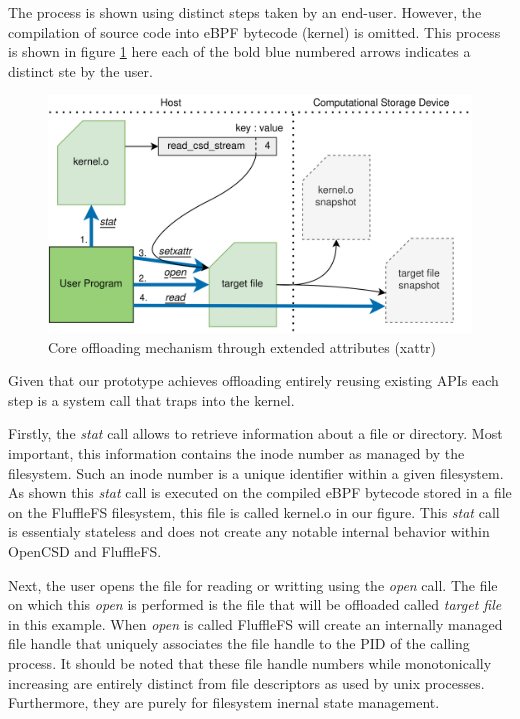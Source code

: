 The process is shown using distinct steps taken by an end-user. However, the
compilation of source code into eBPF bytecode (kernel) is omitted. This process
is shown in figure \ref{figure:offloading} here each of the bold blue numbered
arrows indicates a distinct ste by the user.

\begin{figure}
    \centering
	\includegraphics[width=1\textwidth]{resources/images/offloading.png}
	\caption{Core offloading mechanism through extended attributes (xattr)}
    \label{figure:offloading}
\end{figure}

Given that our prototype achieves offloading entirely reusing existing APIs each
step is a system call that traps into the kernel.

Firstly, the \textit{stat} call allows to retrieve information about a file or
directory. Most important, this information contains the inode number as managed
by the filesystem. Such an inode number is a unique identifier within a given
filesystem. As shown this \textit{stat} call is executed on the compiled eBPF
bytecode stored in a file on the FluffleFS filesystem, this file is called
kernel.o in our figure. This \textit{stat} call is essentialy stateless and does
not create any notable internal behavior within OpenCSD and FluffleFS.

Next, the user opens the file for reading or writting using the \textit{open}
call. The file on which this \textit{open} is performed is the file that will be
offloaded called \textit{target file} in this example. When \textit{open} is
called FluffleFS will create an internally managed file handle that uniquely
associates the file handle to the PID of the calling process. It should be noted
that these file handle numbers while monotonically increasing are entirely
distinct from file descriptors as used by unix processes. Furthermore, they are
purely for filesystem inernal state management.

